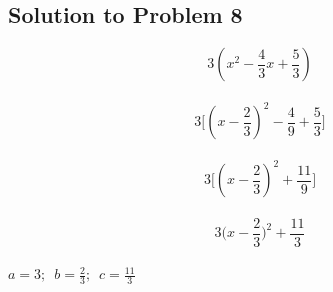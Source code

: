 \documentclass{article}
\begin{document}
\subsection{Solution to Problem 8}
$$ 3(x^2 - \frac{4}{3}x + \frac{5}{3})$$ \\
$$ 3 \Big[ (x - \frac{2}{3})^2 -\frac{4}{9} + \frac{5}{3} \Big] $$ \\
$$ 3 \Big[ (x - \frac{2}{3})^2 + \frac{11}{9} \Big]  $$ \\
$$ 3 \big(x - \frac{2}{3}\big)^2 + \frac{11}{3}  $$ \\
$ a =3; \enspace b= \frac{2}{3}; \enspace c= \frac{11}{3} $
\end{document}
